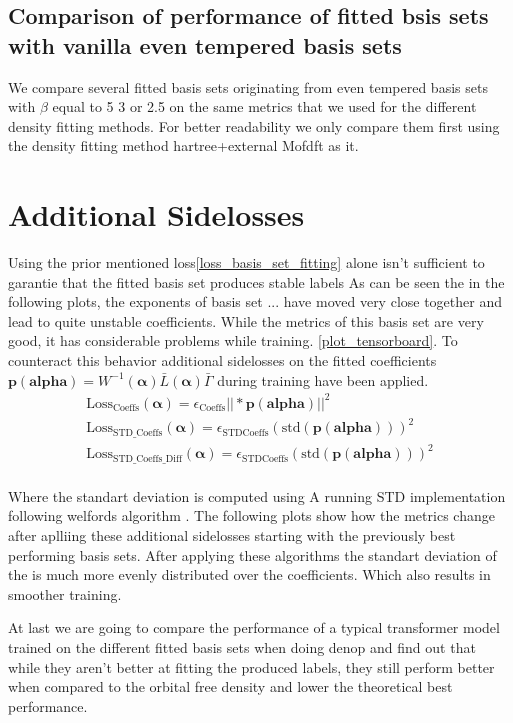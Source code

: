  \subsection{Comparison of performance of fitted bsis sets with vanilla even tempered basis sets}
 We compare several fitted basis sets originating from even tempered basis sets with $\beta$ equal to 5 3 or 2.5 on the same metrics that we used for the different density fitting methods. For better readability we only compare them first using the density fitting method hartree+external Mofdft as it.
 \section{Additional Sidelosses}
 Using the prior mentioned loss\ref{loss_basis_set_fitting} alone isn't sufficient to garantie that the fitted basis set produces stable labels As can be seen the in the following plots, the exponents of basis set ... have moved very close together and lead to quite unstable coefficients. While the metrics of this basis set are very good, it has considerable problems while training. \ref{plot_tensorboard}.
 To counteract this behavior additional sidelosses on the fitted coefficients $\mathbf{p}(\mathbf{alpha}) = W^{-1}(\mathbf{\alpha}) \bar L(\mathbf{\alpha}) \bar \Gamma$ during training have been applied. 
 \begin{align}
    \text{Loss}_\text{Coeffs}(\mathbf{\alpha}) = \epsilon_\text{Coeffs}||*\mathbf{p}(\mathbf{alpha})||^2\\
    \text{Loss}_\text{STD\_Coeffs}(\mathbf{\alpha}) = \epsilon_\text{STDCoeffs}\left(\text{std}(\mathbf{p}(\mathbf{alpha}))\right)^2\\
    \text{Loss}_\text{STD\_Coeffs\_Diff}(\mathbf{\alpha}) = \epsilon_\text{STDCoeffs}\left(\text{std}(\mathbf{p}(\mathbf{alpha}))\right)^2\\
 \end{align}

 Where the standart deviation is computed using A running STD implementation following welfords algorithm \cite{Welford}. 
 The following plots show how the metrics change after aplliing these additional sidelosses starting with the previously best performing basis sets.
 After applying these algorithms the standart deviation of the is much more evenly distributed over the coefficients. 
 Which also results in smoother training.

 At last we are going to compare the performance of a typical transformer model trained on the different fitted basis sets when doing denop and find out that while they aren't better at fitting the produced labels, they still perform better when compared to the orbital free density and lower the theoretical best performance.

